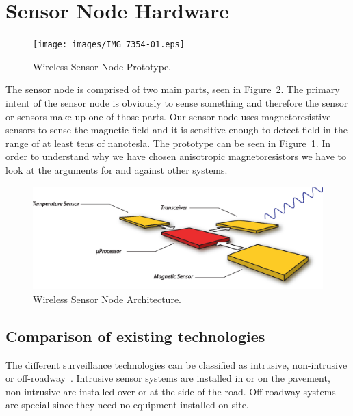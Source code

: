 \section{Sensor Node Hardware}

\begin{figure}
 \centering
 \begin{minipage}{0.8\linewidth}
 \centering
 \texttt{[image: images/IMG\_7354-01.eps]}
  \caption[Wireless Sensor Node Prototype]{Wireless Sensor Node Prototype.}
  \label{fig:prototype}
 \end{minipage}
\end{figure}

The sensor node is comprised of two main parts, seen in Figure~\ref{fig:arch}. The primary intent of the sensor node is obviously to sense something and therefore the sensor or sensors make up one of those parts. Our sensor node uses magnetoresistive sensors to sense the magnetic field and it is sensitive enough to detect field in the range of at least tens of nanotesla. The prototype can be seen in Figure~\ref{fig:prototype}. In order to understand why we have chosen anisotropic magnetoresistors we have to look at the arguments for and against other systems.

\begin{figure}[thbf]
 \centering
 \begin{minipage}{0.8\linewidth}
 \centering
  \includegraphics[width=1\linewidth]{images/architecture}
  \caption[Wireless Sensor Node Architecture]{Wireless Sensor Node Architecture.}
  \label{fig:arch}
 \end{minipage}
\end{figure}


\subsection{Comparison of existing technologies}
The different surveillance technologies can be classified as intrusive, non-intrusive or off-roadway~\cite{path2007}. Intrusive sensor systems are installed in or on the pavement, non-intrusive are installed over or at the side of the road. Off-roadway systems are special since they need no equipment installed on-site.

